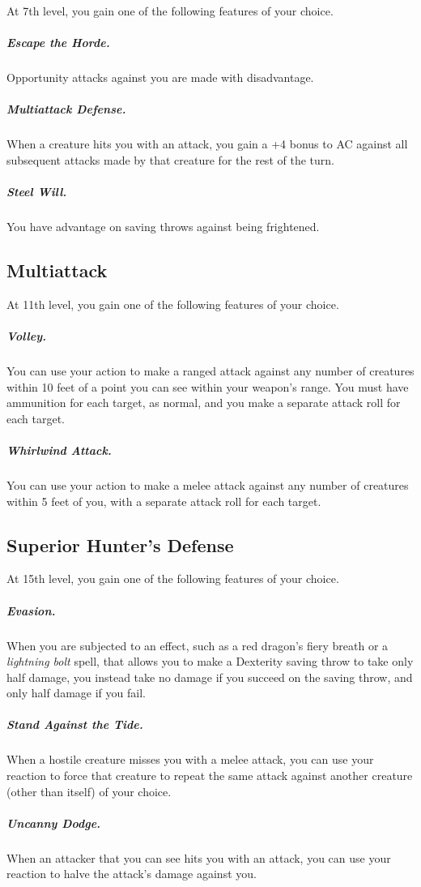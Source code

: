 At 7th level, you gain one of the following features of your choice.

\subparagraph*{Escape the Horde.} Opportunity attacks against you are made with disadvantage.

\subparagraph*{Multiattack Defense.} When a creature hits you with an attack, you gain a +4 bonus to AC against all subsequent attacks made by that creature for the rest of the turn.

\subparagraph*{Steel Will.} You have advantage on saving throws against being frightened.

\subsection{Multiattack}

At 11th level, you gain one of the following features of your choice.

\subparagraph*{Volley.} You can use your action to make a ranged attack against any number of creatures within 10 feet of a point you can see within your weapon’s range. You must have ammunition for each target, as normal, and you make a separate attack roll for each target.

\subparagraph*{Whirlwind Attack.} You can use your action to make a melee attack against any number of creatures within 5 feet of you, with a separate attack roll for each target.

\subsection{Superior Hunter’s Defense}

At 15th level, you gain one of the following features of your choice.

\subparagraph*{Evasion.} When you are subjected to an effect, such as a red dragon’s fiery breath or a \textit{lightning bolt} spell, that allows you to make a Dexterity saving throw to take only half damage, you instead take no damage if you succeed on the saving throw, and only half damage if you fail.

\subparagraph*{Stand Against the Tide.} When a hostile creature misses you with a melee attack, you can use your reaction to force that creature to repeat the same attack against another creature (other than itself) of your choice.

\subparagraph*{Uncanny Dodge.} When an attacker that you can see hits you with an attack, you can use your reaction to halve the attack’s damage against you.
